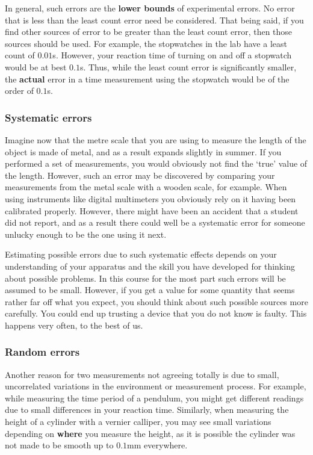 In general, such errors are the \textbf{lower bounds} of experimental errors. No error that is less than the least count error need be considered. That being said, if you find other sources of error to be greater than the least count error, then those sources should be used. For example, the stopwatches in the lab have a least count of $0.01$s. However, your reaction time of turning on and off a stopwatch would be at best $0.1$s. Thus, while the least count error is significantly smaller, the \textbf{actual} error in a time measurement using the stopwatch would be of the order of $0.1$s.

\subsubsection{Systematic errors}

Imagine now that the metre scale that you are using to measure the length of the object is made of metal, and as a result expands slightly in summer. If you performed a set of measurements, you would obviously not find the `true' value of the length. However, such an error may be discovered by comparing your measurements from the metal scale with a wooden scale, for example. When using instruments like digital multimeters you obviously rely on it having been calibrated properly. However, there might have been an accident that a student did not report, and as a result there could well be a systematic error for someone unlucky enough to be the one using it next.

Estimating possible errors due to such systematic effects depends on your understanding of your apparatus and the skill you have developed for thinking about possible problems. In this course for the most part such errors will be assumed to be small. However, if you get a value for some quantity that seems rather far off what you expect, you should think about such possible sources more carefully. You could end up trusting a device that you do not know is faulty. This happens very often, to the best of us. 


\subsubsection{Random errors}

Another reason for two measurements not agreeing totally is due to small, uncorrelated variations in the environment or measurement process. For example, while measuring the time period of a pendulum, you might get different readings due to small differences in your reaction time. Similarly, when measuring the height of a cylinder with a vernier calliper, you may see small variations depending on \textbf{where} you measure the height, as it is possible the cylinder was not made to be smooth up to $0.1$mm everywhere.

